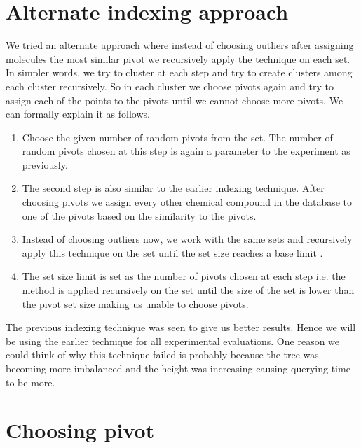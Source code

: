 \section{Alternate indexing approach}

We tried an alternate approach where instead of choosing outliers after assigning molecules the most similar pivot we recursively apply the technique on each set. In simpler words, we try to cluster at each step and try to create clusters among each cluster recursively. So in each cluster we choose pivots again and try to assign each of the points to the pivots until we cannot choose more pivots. We can formally explain it as follows.


\begin{enumerate}

\item Choose the given number of random pivots from the set. The number of random pivots chosen at this step is again a parameter to the experiment as previously.

\item The second step is also similar to the earlier indexing technique. After choosing pivots we assign every other chemical compound in the database to one of the pivots based on the similarity to the pivots.
 
\item Instead of choosing outliers now, we work with the same sets and recursively apply this technique on the set until the set size reaches a base limit .

\item The set size limit is set as the number of pivots chosen at each step i.e. the method is applied recursively on the set until the size of the set is lower than the pivot set size making us unable to choose pivots. \\

\end{enumerate}

The previous indexing technique was seen to give us better results. Hence we will be using the earlier technique for all experimental evaluations. One reason we could think of why this technique failed is probably because the tree was becoming more imbalanced and the height was increasing causing querying time to be more.



\section{Choosing pivot}

